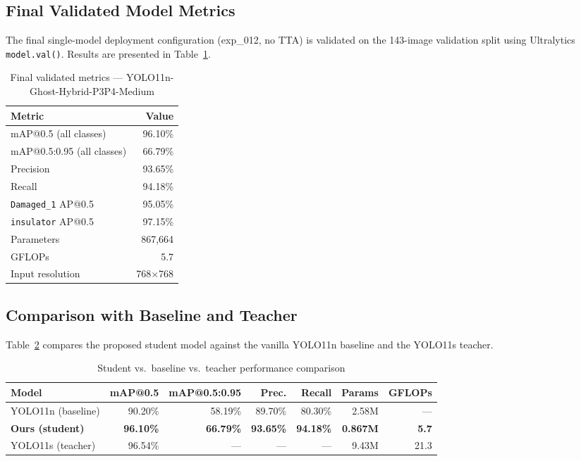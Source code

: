 \documentclass[11pt,a4paper]{article}
\begin{document}
\subsection{Final Validated Model Metrics}

The final single-model deployment configuration (exp\_012, no TTA) is validated on the
143-image validation split using Ultralytics \texttt{model.val()}. Results are presented
in Table~\ref{tab:final_metrics}.

\begin{table}[H]
\centering
\caption{Final validated metrics --- YOLO11n-Ghost-Hybrid-P3P4-Medium}
\label{tab:final_metrics}
\begin{tabular}{lr}
\toprule
\textbf{Metric}              & \textbf{Value}  \\
\midrule
mAP@0.5 (all classes)        & 96.10\%         \\
mAP@0.5:0.95 (all classes)   & 66.79\%         \\
Precision                    & 93.65\%         \\
Recall                       & 94.18\%         \\
\texttt{Damaged\_1} AP@0.5   & 95.05\%         \\
\texttt{insulator} AP@0.5    & 97.15\%         \\
Parameters                   & 867{,}664       \\
GFLOPs                       & 5.7             \\
Input resolution             & 768$\times$768  \\
\bottomrule
\end{tabular}
\end{table}

\subsection{Comparison with Baseline and Teacher}

Table~\ref{tab:comparison} compares the proposed student model against the vanilla
YOLO11n baseline and the YOLO11s teacher.

\begin{table}[H]
\centering
\caption{Student vs.\ baseline vs.\ teacher performance comparison}
\label{tab:comparison}
\begin{tabular}{lrrrrrr}
\toprule
\textbf{Model}           & \textbf{mAP@0.5} & \textbf{mAP@0.5:0.95} &
\textbf{Prec.} & \textbf{Recall} & \textbf{Params} & \textbf{GFLOPs} \\
\midrule
YOLO11n (baseline)       & 90.20\%  & 58.19\% & 89.70\% & 80.30\% & 2.58M  & ---   \\
\textbf{Ours (student)}  & \textbf{96.10\%} & \textbf{66.79\%} & \textbf{93.65\%} & \textbf{94.18\%} & \textbf{0.867M} & \textbf{5.7} \\
YOLO11s (teacher)        & 96.54\%  & ---     & ---     & ---     & 9.43M  & 21.3  \\
\bottomrule
\end{tabular}
\end{table}
\end{document}
